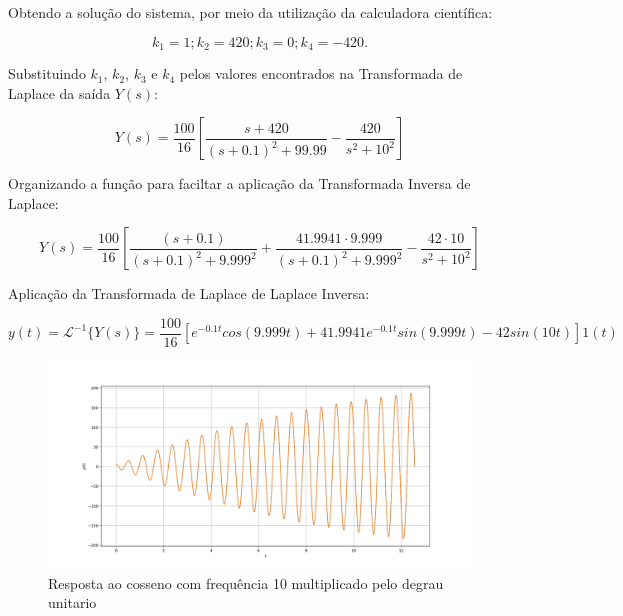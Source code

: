 \documentclass[10pt]{article}
\begin{document}
\quad Obtendo a solução do sistema, por meio da utilização da calculadora científica:

\begin{equation}
    k_1 = 1; k_2 = 420; k_3 = 0; k_4 = -420.
\end{equation}

\quad Substituindo $k_1$, $k_2$, $k_3$ e $k_4$ pelos valores encontrados na Transformada de Laplace da saída $Y(s)$:

\begin{equation}
    Y(s) = \frac{100}{16} \left[ \frac{s+420}{(s + 0.1)^2 + 99.99} - \frac{420}{s^2 + 10^2} \right]
\end{equation}

\quad Organizando a função para faciltar a aplicação da Transformada Inversa de Laplace:

\begin{equation}
    Y(s) = \frac{100}{16} \left[ \frac{(s + 0.1)}{(s + 0.1)^2 + 9.999^2} + \frac{41.9941 \cdot 9.999}{(s + 0.1)^2 + 9.999^2} - \frac{42 \cdot 10}{s^2 + 10^2} \right]
\end{equation}

\quad Aplicação da Transformada de Laplace de Laplace Inversa:

\begin{equation}
    y(t) = \mathcal{L}^{-1} \{Y(s) \} = \frac{100}{16} \left[ e^{-0.1t}cos(9.999t) + 41.9941e^{-0.1t}sin(9.999t) - 42sin(10t) \right] 1(t)
\end{equation}

\begin{figure}[h]
    \centering
    \includegraphics[scale=0.4]{questao3.png}
    \caption{Resposta ao cosseno com frequência 10 multiplicado pelo degrau unitario}
\end{figure}
\end{document}
